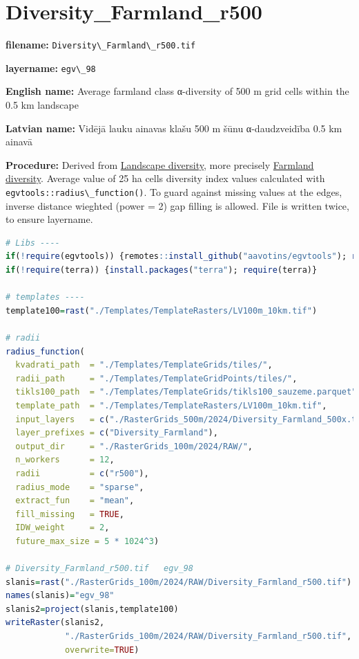 \documentclass[
]{book}
\newcommand{\passthrough}[1]{#1}
\begin{document}
\section{Diversity\_Farmland\_r500}\label{ch06.098}

\textbf{filename:} \passthrough{\lstinline!Diversity\_Farmland\_r500.tif!}

\textbf{layername:} \passthrough{\lstinline!egv\_98!}

\textbf{English name:} Average farmland class α-diversity of 500 m grid cells within the 0.5 km landscape

\textbf{Latvian name:} Vidējā lauku ainavas klašu 500 m šūnu α-daudzveidība 0.5 km ainavā

\textbf{Procedure:} Derived from \hyperref[Ch05.04]{Landscape diversity}, more precisely
\hyperref[Ch05.04.0]{Farmland diversity}. Average value of 25 ha
cells diversity index values calculated with \passthrough{\lstinline!egvtools::radius\_function()!}. To
guard against missing values at the edges, inverse distance wieghted (power = 2)
gap filling is allowed. File is written twice, to ensure layername.

\begin{lstlisting}[language=R]
# Libs ----
if(!require(egvtools)) {remotes::install_github("aavotins/egvtools"); require(egvtools)}
if(!require(terra)) {install.packages("terra"); require(terra)}

# templates ----
template100=rast("./Templates/TemplateRasters/LV100m_10km.tif")

# radii
radius_function(
  kvadrati_path  = "./Templates/TemplateGrids/tiles/",
  radii_path     = "./Templates/TemplateGridPoints/tiles/",
  tikls100_path  = "./Templates/TemplateGrids/tikls100_sauzeme.parquet",
  template_path  = "./Templates/TemplateRasters/LV100m_10km.tif",
  input_layers   = c("./RasterGrids_500m/2024/Diversity_Farmland_500x.tif"),
  layer_prefixes = c("Diversity_Farmland"),
  output_dir     = "./RasterGrids_100m/2024/RAW/",
  n_workers      = 12,
  radii          = c("r500"),
  radius_mode    = "sparse",
  extract_fun    = "mean",
  fill_missing   = TRUE,
  IDW_weight     = 2,
  future_max_size = 5 * 1024^3)

# Diversity_Farmland_r500.tif   egv_98
slanis=rast("./RasterGrids_100m/2024/RAW/Diversity_Farmland_r500.tif")
names(slanis)="egv_98"
slanis2=project(slanis,template100)
writeRaster(slanis2,
            "./RasterGrids_100m/2024/RAW/Diversity_Farmland_r500.tif",
            overwrite=TRUE)
\end{lstlisting}
\end{document}
